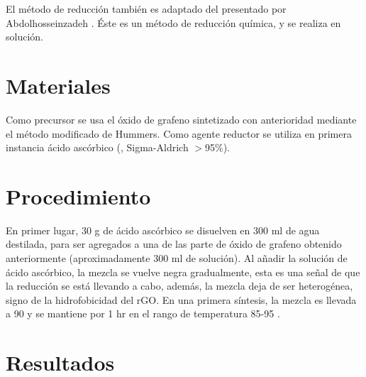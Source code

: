 El método de reducción también es adaptado del presentado por Abdolhosseinzadeh \citep{Abdolhosseinzadeh2015}. Éste es un método de reducción química, y se realiza en solución.

\section{Materiales}
Como precursor se usa el óxido de grafeno sintetizado con anterioridad mediante el método modificado de Hummers. Como agente reductor se utiliza en primera instancia ácido ascórbico (, Sigma-Aldrich $>$95\%).

\section{Procedimiento}
En primer lugar, 30 g de ácido ascórbico se disuelven en 300 ml de agua destilada, para ser agregados a una de las parte de óxido de grafeno obtenido anteriormente (aproximadamente 300 ml de solución). Al añadir la solución de ácido ascórbico, la mezcla se vuelve negra gradualmente, esta es una señal de que la reducción se está llevando a cabo, además, la mezcla deja de ser heterogénea, signo de la hidrofobicidad del rGO. En una primera síntesis, la mezcla es llevada a 90 \degrees y se mantiene por 1 hr en el rango de temperatura 85-95 \degrees.

\section{Resultados}